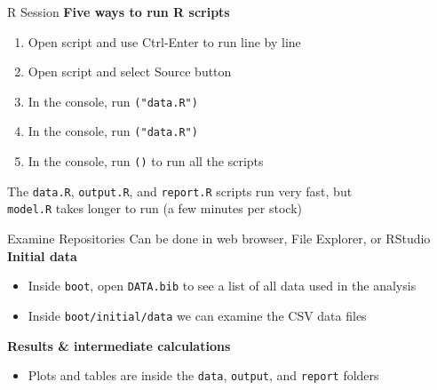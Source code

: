 \documentclass[aspectratio=169]{beamer}
\begin{document}
\begin{frame}{R Session}
  \textbf{\darkgreen Five ways to run R scripts}\\[1.5ex]
  \begin{enumerate}
    \item Open script and use {\darkblue Ctrl-Enter} to run line by line\\[2ex]
    \item Open script and select {\darkblue Source} button\\[2ex]
    \item In the console, run {\tt {}("data.R")}\\[2ex]
    \item In the console, run {\tt {}("data.R")}\\[2ex]
    \item In the console, run {\tt {}()} to run all the
    scripts\\[2ex]
  \end{enumerate}
  \vspace{1ex}
  The {\tt\darkgreen data.R}, {\tt\darkgreen output.R}, and
  {\tt\darkgreen report.R} scripts run very fast, but\\[0.2ex]
  {\tt\orange model.R} takes longer to run (a few minutes per stock)
\end{frame}


\begin{frame}{Examine Repositories}
  Can be done in {\darkgreen web browser}, {\darkgreen File Explorer}, or
  {\darkgreen RStudio}\\[4ex]
  {\bf\darkgreen Initial data}\\[1ex]
  \begin{itemize}
    \item[] Inside {\tt boot}, open {\tt\darkgreen DATA.bib} to see a list of
    all data used in the analysis\\[2ex]
    \item[] Inside {\tt boot/initial/data} we can examine the
    {\darkgreen CSV data files}\\[2ex]
  \end{itemize}
  \vspace{3ex}
  {\bf\darkgreen Results \& intermediate calculations}\\[1ex]
  \begin{itemize}
    \item[] {\darkgreen Plots} and {\darkgreen tables} are inside the
    {\tt data}, {\tt output}, and {\tt report} folders\\[2ex]
  \end{itemize}
\end{frame}
\end{document}

